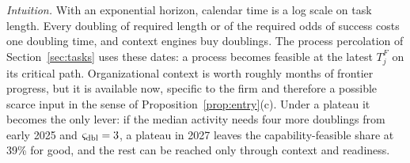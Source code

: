 \noindent\emph{Intuition.} With an exponential horizon, calendar time is a log scale on task length. Every doubling of required length or of the required odds of success costs one doubling time, and context engines buy doublings. The process percolation of Section~\ref{sec:tasks} uses these dates: a process becomes feasible at the latest $T^F_j$ on its critical path. Organizational context is worth roughly months of frontier progress, but it is available now, specific to the firm and therefore a possible scarce input in the sense of Proposition~\ref{prop:entry}(c). Under a plateau it becomes the only lever: if the median activity needs four more doublings from early 2025 and $\varsigma_{\rm dbl}=3$, a plateau in 2027 leaves the capability-feasible share at 39\% for good, and the rest can be reached only through context and readiness.

